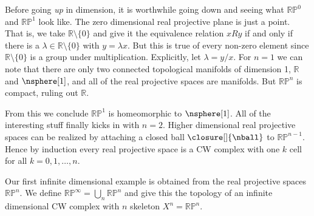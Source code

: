 \documentclass{book}                                                           %
\begin{document}
            \par\vspace{2.5ex}
            \hfill
            \begin{minipage}[b]{0.54\textwidth}
                Before going \textit{up} in dimension, it is worthwhile going
                down and seeing what $\mathbb{RP}^{0}$ and $\mathbb{RP}^{1}$
                look like. The zero dimensional real projective plane is just a
                point. That is, we take $\mathbb{R}\setminus\{0\}$ and give it
                the equivalence relation $xRy$ if and only if there is a
                $\lambda\in\mathbb{R}\setminus\{0\}$ with $y=\lambda{x}$. But
                this is true of every non-zero element since
                $\mathbb{R}\setminus\{0\}$ is a group under multiplication.
                Explicitly, let $\lambda=y/x$. For $n=1$ we can note that there
                are only two connected topological manifolds of dimension 1,
                $\mathbb{R}$ and $\nsphere[1]$, and all of the real projective
                spaces are manifolds. But $\mathbb{RP}^{n}$ is compact, ruling
                out $\mathbb{R}$.
            \end{minipage}
            \par\vspace{2.5ex}
            From this we conclude $\mathbb{RP}^{1}$ is homeomorphic to
            $\nsphere[1]$. All of the interesting stuff finally kicks in with
            $n=2$. Higher dimensional real projective spaces can be realized by
            attaching a closed ball $\closure[]{\nball}$ to $\mathbb{RP}^{n-1}$.
            Hence by induction every real projective space is a CW complex with
            one $k$ cell for all $k=0,1,\dots,n$.
            \begin{example}
                Our first infinite dimensional example is obtained from
                the real projective spaces $\mathbb{RP}^{n}$. We define
                $\mathbb{RP}^{\infty}=\bigcup_{n}\mathbb{RP}^{n}$ and give
                this the topology of an infinite dimensional CW complex with
                $n$ skeleton $X^{n}=\mathbb{RP}^{n}$.
            \end{example}
\end{document}
